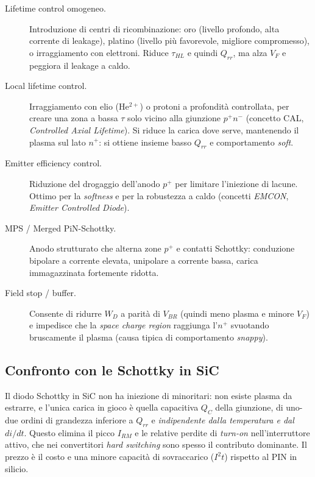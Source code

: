 \documentclass[11pt,a4paper]{article}
\begin{document}
\begin{description}
\item[Lifetime control omogeneo.] Introduzione di centri di ricombinazione:
oro (livello profondo, alta corrente di leakage), platino (livello più
favorevole, migliore compromesso), o irraggiamento con elettroni. Riduce
$\tau_{HL}$ e quindi $Q_{rr}$, ma alza $V_F$ e peggiora il leakage a caldo.

\item[Local lifetime control.] Irraggiamento con elio (He$^{2+}$) o protoni a
profondità controllata, per creare una zona a bassa $\tau$ solo vicino alla
giunzione $p^{+}n^{-}$ (concetto CAL, \emph{Controlled Axial Lifetime}). Si
riduce la carica dove serve, mantenendo il plasma sul lato $n^{+}$: si ottiene
insieme basso $Q_{rr}$ e comportamento \emph{soft}.

\item[Emitter efficiency control.] Riduzione del drogaggio dell'anodo $p^{+}$
per limitare l'iniezione di lacune. Ottimo per la \emph{softness} e per la
robustezza a caldo (concetti \emph{EMCON}, \emph{Emitter Controlled Diode}).

\item[MPS / Merged PiN-Schottky.] Anodo strutturato che alterna zone $p^{+}$ e
contatti Schottky: conduzione bipolare a corrente elevata, unipolare a corrente
bassa, carica immagazzinata fortemente ridotta.

\item[Field stop / buffer.] Consente di ridurre $W_D$ a parità di $V_{BR}$
(quindi meno plasma e minore $V_F$) e impedisce che la \emph{space charge
region} raggiunga l'$n^{+}$ svuotando bruscamente il plasma
(causa tipica di comportamento \emph{snappy}).
\end{description}

\subsection{Confronto con le Schottky in SiC}

Il diodo Schottky in SiC non ha iniezione di minoritari: non esiste plasma da
estrarre, e l'unica carica in gioco è quella capacitiva $Q_C$ della giunzione,
di uno-due ordini di grandezza inferiore a $Q_{rr}$ e \emph{indipendente dalla
temperatura e dal $di/dt$}. Questo elimina il picco $I_{RM}$ e le relative
perdite di \emph{turn-on} nell'interruttore attivo, che nei convertitori
\emph{hard switching} sono spesso il contributo dominante. Il prezzo è il costo
e una minore capacità di sovraccarico ($I^{2}t$) rispetto al PIN in silicio.
\end{document}
